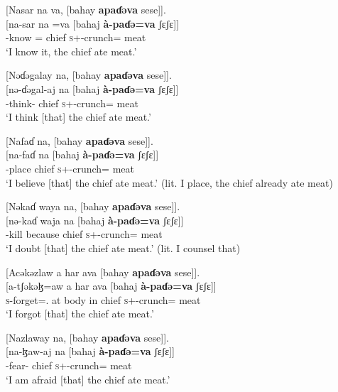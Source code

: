 \ea \label{ex:12:14}
{}[Nasar  na  va,  [bahay  \textbf{apaɗəva}  sese]]. \\
\gll  {}[na-sar na   =va   [bahaj   \textbf{à-paɗə}\textbf{=va}   ʃɛʃɛ]]\\
      {\oneS}-know  {\DO}  ={\PRF}  chief  \textsc{s}+{\PFV}-crunch={\PRF}  meat\\
\glt  ‘I know it, the chief ate meat.’ 
\z 

\ea \label{ex:12:15}
{}[Nəɗəgalay  na,  [bahay  \textbf{apaɗəva}  sese]].\\
\gll  {}[nə-ɗəgal-aj   na   [bahaj   \textbf{à-paɗə}\textbf{=va}   ʃɛʃɛ]]\\
      {\oneS}-think{}-{\CL}  {\PSP}  chief  \textsc{s}+{\PFV}-crunch={\PRF}  meat\\
\glt  ‘I think [that] the chief ate meat.’ 
\z 

\ea \label{ex:12:16}
{}[Nafaɗ  na,  [bahay  \textbf{apaɗəva}  sese]].\\
\gll  {}[na-faɗ   na   [bahaj   \textbf{à-paɗə}\textbf{=va}    ʃɛʃɛ]]\\
      {\oneS}-place  {\PSP}  chief  \textsc{s}+{\PFV}-crunch={\PRF}  meat\\
\glt  ‘I believe [that] the chief ate meat.’ (lit. I place, the chief already ate meat) 
\z 

\ea \label{ex:12:17}
{}[Nəkaɗ  waya  na,  [bahay  \textbf{apaɗəva}  sese]].\\
\gll  {}[nə-kaɗ   waja   na   [bahaj   \textbf{à-paɗə}\textbf{=va}  ʃɛʃɛ]]\\
      {\oneS}-kill because {\PSP} chief \textsc{s}+{\PFV}-crunch={\PRF}  meat\\
\glt  ‘I doubt [that] the chief ate meat.’  (lit. I counsel that) 
\z 

\ea \label{ex:12:18}
{}[Acəkəzlaw  a  har  ava  [bahay  \textbf{apaɗəva}  sese]].\\
\gll  {}[a-tʃəkəɮ=aw   a  har  ava  [bahaj   \textbf{à-paɗə}\textbf{=va} ʃɛʃɛ]]\\
      \textsc{s}-forget={\oneS}.{\IO}  at  body  in  chief  \textsc{s}+{\PFV}-crunch={\PRF}  meat\\
\glt  ‘I forgot [that] the chief ate meat.’  
\z 

\ea \label{ex:12:19}
{}[Nazlaway  na,  [bahay  \textbf{apaɗəva}  sese]].\\
\gll  {}[na-ɮaw-aj   na   [bahaj   \textbf{à-paɗə}\textbf{=va} ʃɛʃɛ]]\\
      {\oneS}-fear{}-{\CL}  {\PSP}  chief  \textsc{s}+{\PFV}-crunch={\PRF}  meat\\
\glt  ‘I am afraid [that] the chief ate meat.’
\z 

